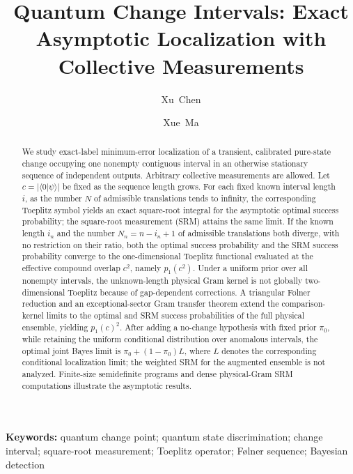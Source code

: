 \documentclass[a4paper,twocolumn,10pt,unpublished]{quantumarticle}
\numberwithin{equation}{section}
\theoremstyle{remark}
\begin{document}
\title{Quantum Change Intervals:
Exact Asymptotic Localization with Collective Measurements}

\author{Xu~Chen}
\author{Xue~Ma}

\maketitle

\begin{abstract}
We study exact-label minimum-error localization of a transient, calibrated
pure-state change occupying one nonempty contiguous interval in an otherwise
stationary sequence of independent outputs. Arbitrary collective measurements
are allowed. Let \(c=\lvert\langle0\vert\psi\rangle\rvert\) be fixed as the
sequence length grows. For each fixed known interval length \(i\), as the number
\(N\) of admissible translations tends to infinity, the corresponding Toeplitz
symbol yields an exact square-root integral for the asymptotic optimal success
probability; the square-root measurement (SRM) attains the same limit. If the
known length \(i_n\) and the number \(N_n=n-i_n+1\) of admissible translations
both diverge, with no restriction on their ratio, both the optimal success
probability and the SRM success probability converge to the one-dimensional
Toeplitz functional evaluated at the effective compound overlap \(c^2\), namely
\(p_1(c^2)\). Under a uniform prior over all nonempty intervals, the
unknown-length physical Gram kernel is not globally two-dimensional Toeplitz
because of gap-dependent corrections. A triangular Følner reduction and an
exceptional-sector Gram transfer theorem extend the comparison-kernel limits to
the optimal and SRM success probabilities of the full physical ensemble,
yielding \(p_1(c)^2\). After adding a no-change hypothesis with fixed prior
\(\pi_0\), while retaining the uniform conditional distribution over anomalous
intervals, the optimal joint Bayes limit is \(\pi_0+(1-\pi_0)L\), where \(L\)
denotes the corresponding conditional localization limit; the weighted SRM for
the augmented ensemble is not analyzed. Finite-size semidefinite programs and
dense physical-Gram SRM computations illustrate the asymptotic results.
\end{abstract}

\noindent\textbf{Keywords:} quantum change point; quantum state
discrimination; change interval; square-root measurement; Toeplitz operator;
Følner sequence; Bayesian detection





\end{document}
